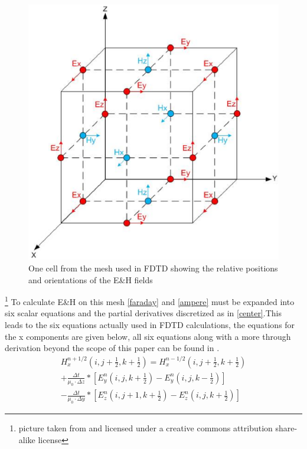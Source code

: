 \documentclass[twocolumn]{article}
\begin{document}
\begin{figure}[h]
\includegraphics[keepaspectratio,width=\linewidth]{YeeCell01}
\caption{One cell from the mesh used in FDTD showing the relative positions and orientations of the E\&H fields}
\end{figure}\footnote{picture taken from \cite{wiki} and licensed under a creative commons attribution share-alike license}
To calculate E\&H on this mesh \eqref{faraday} and \eqref{ampere} must be expanded into six scalar
equations and the partial derivatives discretized as in \eqref{center}.This leads to the six
equations actually used in FDTD calculations, the equations for the x components are given below,
all six equations along with a more through derivation beyond the scope of this paper can be found
in \cite{parallel}.
\begin{multline} \label{Hx}
H_x^{n+1/2}(i,j+\frac{1}{2},k+\frac{1}{2})=H_x^{n-1/2}(i,j+\frac{1}{2},k+\frac{1}{2})\\
+\frac{\Delta{t}}{\mu_0\cdot\Delta{z}}*[E_y^n(i,j,k+\frac{1}{2})-E_y^n(i,j,k-\frac{1}{2})]\\
-\frac{\Delta{t}}{\mu_0\cdot\Delta{y}}*[E_z^n(i,j+1,k+\frac{1}{2})-E_z^n(i,j,k+\frac{1}{2})]
\end{multline}
\end{document}
